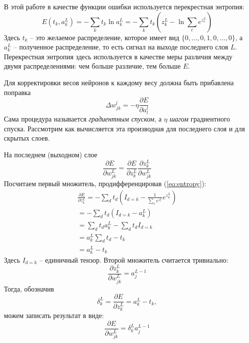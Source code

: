 \documentclass[a4paper,12pt]{article}
\theoremstyle{remark}
\begin{document}
	В этой работе в качестве функции ошибки используется перекрестная энтропия:
	\begin{equation}\label{eq:entropy}
		E(t_k, a_k^L) = - \sum_k t_k \ln a_k^L = - \sum_k t_k (z_k^L - \ln \sum_c e^{z_c^L})
	\end{equation}
	Здесь $t_k$ -- это желаемое распределение, которое имеет вид $\{0, \dots, 0, 1, 0, \dots, 0\}$, а $a_k^L$ -- полученное распределение, то есть сигнал на выходе последнего слоя $L$. Перекрестная энтропия здесь используется в качестве меры различия между двумя распределениями: чем больше различие, тем больше $E$.
	
	Для корректировки весов нейронов к каждому весу должна быть прибавлена поправка
	\begin{equation}
		\Delta w_{jk}^l = - \eta \frac{\partial E}{\partial a_l^l}
	\end{equation}
	Сама процедура называется \textit{градиентным спуском}, а $\eta$ \textit{шагом} градиентного спуска. Рассмотрим как вычисляется эта производная для последнего слоя и для скрытых слоев.
	
	На последнем (выходном) слое
	\begin{equation}
		\frac{\partial E}{\partial w_{jk}^L} = \frac{\partial E}{\partial z_k^L} \frac{\partial z_k^L}{\partial w_{jk}^L}
	\end{equation}
	Посчитаем первый множитель, продифференцировав (\ref{eq:entropy}):
	\begin{equation}
		\begin{gathered}
			\frac{\partial E}{\partial z_k^L} = - \sum_d t_d (I_{d = k} - \frac{1}{\sum_c e^{z_c^L}} e^{z_k^L}) \\
			= - \sum_d t_d (I_{d = k} - a_k^L) \\
			= \sum_d t_d a_k^L - \sum_d t_d I_{d = k} \\
			= a_k^L \sum_d t_d - t_k \\
			= a_k^L - t_k
		\end{gathered}
	\end{equation}
	Здесь $I_{d = k}$ -- единичный тензор. Второй множитель считается тривиально:
	\begin{equation}
		\frac{\partial z_k^L}{\partial w_{jk}^L} = a_j^{L-1}
	\end{equation}
	Тогда, обозначив
	\begin{equation}
		\delta_k^L = \frac{\partial E}{\partial z_k^L} = a_k^L - t_k,
	\end{equation}
	можем записать результат в виде:
	\begin{equation}
		\frac{\partial E}{\partial w_{jk}^L} = \delta_k^L a_j^{L-1}
	\end{equation}
	
\end{document}

